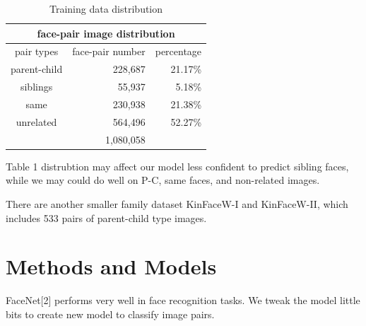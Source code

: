 \documentclass{article}
\begin{document}
\begin{table}[h]
	\centering
	\begin{tabular}{ | c || r r | }
		\hline
		\multicolumn{3}{|c|}{face-pair image distribution} \\
		\hline
		pair types&face-pair number&percentage\\
		\hline
			parent-child & 228,687 &21.17\% \\
			siblings & 55,937 & 5.18\% \\
			same & 230,938 & 21.38\% \\
			unrelated & 564,496 & 52.27\% \\
		\hline
			& 1,080,058 & \\
		\hline
	\end{tabular}
	\caption{Training data distribution}
	\label{table:1}
\end{table}

Table 1 distrubtion may affect our model less confident to predict sibling
faces, while we may could do well on P-C, same faces, and non-related images.

There are another smaller family dataset KinFaceW-I and KinFaceW-II, which
includes 533 pairs of parent-child type images.


\section{Methods and Models}

FaceNet[2] performs very well in face recognition tasks. We tweak the
model little bits to create new model to classify image pairs.
\end{document}

